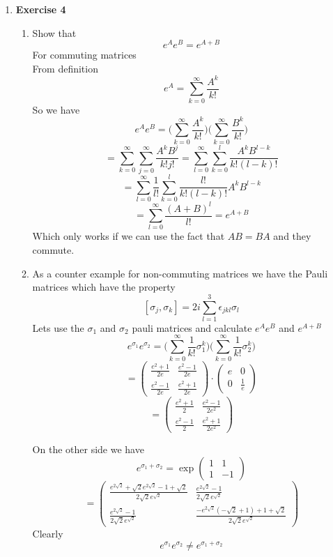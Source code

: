\documentclass[12pt]{article}
\begin{document}
\begin{enumerate}
\item \textbf{Exercise 4} 
\begin{enumerate}
    \item Show that 
    $$ e^A e^B = e^{A+B} $$
    For commuting matrices \\
    From definition 
    $$ e^A = \sum_{k=0}^\infty \frac{A^k}{k!} $$
    So we have 
    $$ e^A e^B = \Big(\sum_{k=0}^\infty \frac{A^k}{k!} \Big) \Big(\sum_{k=0}^\infty \frac{B^k}{k!} \Big) $$
    $$ = \sum_{k=0}^\infty \sum_{j=0}^\infty \frac{A^k B^j}{k! j!} = \sum_{l=0}^\infty \sum_{k=0}^l \frac{A^k B^{l-k}}{k! (l-k)!} $$
    $$ = \sum_{l=0}^\infty \frac{1}{l!} \sum_{k=0}^l \frac{l!}{k!(l-k)!}A^k B^{l-k} $$
    $$ = \sum_{l=0}^\infty \frac{(A+B)^l}{l!} = e^{A+B} $$
    Which only works if we can use the fact that $AB = BA$ and they commute. \\
    \item 
    As a counter example for non-commuting matrices we have the Pauli matrices which have the property 
    $$ [ \sigma_j, \sigma_k ] = 2i \sum_{l=1}^3 \epsilon_{jkl} \sigma_l $$
    Lets use the $\sigma_1$ and $\sigma_2$ pauli matrices and calculate $e^A e^B$ and $e^{A+B}$ 
    $$ e^{\sigma_1} e^{\sigma_2} = \Big(\sum_{k=0}^\infty \frac{1}{k!} \sigma_1^k \Big) \Big(\sum_{k=0}^\infty \frac{1}{k!} \sigma_2^k \Big) $$
    $$ = \left(\begin{array}{cc} \frac{e^2 +1}{2e} & \frac{e^2 -1 }{2e} \\ \frac{e^2 -1}{2e} & \frac{e^2 +1}{2e} \end{array}\right) \cdot \left(\begin{array}{cc} e & 0 \\ 0 & \frac{1}{e} \end{array}\right) $$
    $$ = \left(\begin{array}{cc} \frac{e^2 +1}{2} & \frac{e^2 -1 }{2e^2} \\ \frac{e^2 -1}{2} & \frac{e^2 +1}{2e^2} \end{array}\right) $$

    On the other side we have 
    $$ e^{\sigma_1 + \sigma_2} = \exp \left(\begin{array}{cc} 1 & 1\\ 1 & -1 \end{array}\right) $$
    $$ = \left(\begin{array}{cc} \frac{e^{2 \sqrt{2}} + \sqrt{2} e^{2 \sqrt{2}} -1 + \sqrt{2}}{2 \sqrt{2} e^{\sqrt{2}}} & \frac{e^{2 \sqrt{2}}-1}{2 \sqrt{2} e^{\sqrt{2}}} \\ \frac{e^{2 \sqrt{2}} -1}{2 \sqrt{2} e^{\sqrt{2}}} & \frac{-e^{2 \sqrt{2}}(- \sqrt{2}+1) +1 + \sqrt{2}}{2 \sqrt{2} e^{\sqrt{2}}} \end{array}\right) $$
    Clearly 
    $$ e^{\sigma_1} e^{\sigma_2} \neq e^{\sigma_1 + \sigma_2} $$


\end{enumerate}

\end{enumerate}
\end{document}
